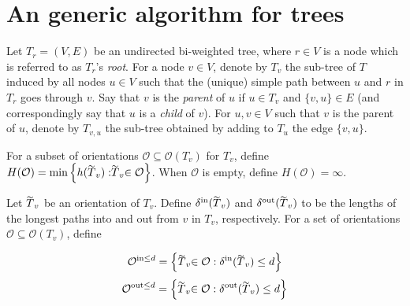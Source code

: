\section{An generic algorithm for trees}\label{s.trees}

%
%
%

Let $T_r = (V, E)$ be an undirected bi-weighted tree, where $r \in V$ is a node which is referred to as $T_r$'s \emph{root}. For a node $v \in V$, denote by $T_v$ the sub-tree of $T$ induced by all nodes $u \in V$ such that the (unique) simple path between $u$ and $r$ in $T_r$ goes through $v$. Say that $v$ is the \emph{parent} of $u$ if $u \in T_v$ and $\{v, u\} \in E$ (and correspondingly say that $u$ is a \emph{child} of $v$).
For $u, v \in V$ such that $v$ is the parent of $u$, denote by $T_{v,u}$ the sub-tree obtained by adding to $T_u$ the edge $\{v, u\}$. 

For a subset of orientations $\mathcal{O} \subseteq \mathcal{O}(T_v)$ for $T_v$, define $H(\mathcal{O}) = \min\left\{h(\tildeb{T}_v): \tildeb{T}_v \in \mathcal{O}\right\}$. When $\mathcal{O}$ is empty, define $H(\mathcal{O}) = \infty$.

Let $\tildeb{T}_v$ be an orientation of $T_v$. Define $\delta^\text{in}(\tildeb{T}_v)$ and $\delta^\text{out}(\tildeb{T}_v)$ to be the lengths of the longest paths into and out from $v$ in $T_v$, respectively. For a set of orientations $\mathcal{O} \subseteq \mathcal{O}(T_v)$, define 

$$\mathcal{O}^{\text{in} \leq d} = \left\{\tildeb{T}_v \in \mathcal{O}: \delta^{\text{in}}(\tildeb{T}_v) \leq d\right\} $$
$$\mathcal{O}^{\text{out} \leq d} = \left\{\tildeb{T}_v \in \mathcal{O}: \delta^{\text{out}}(\tildeb{T}_v) \leq d\right\} $$

%

